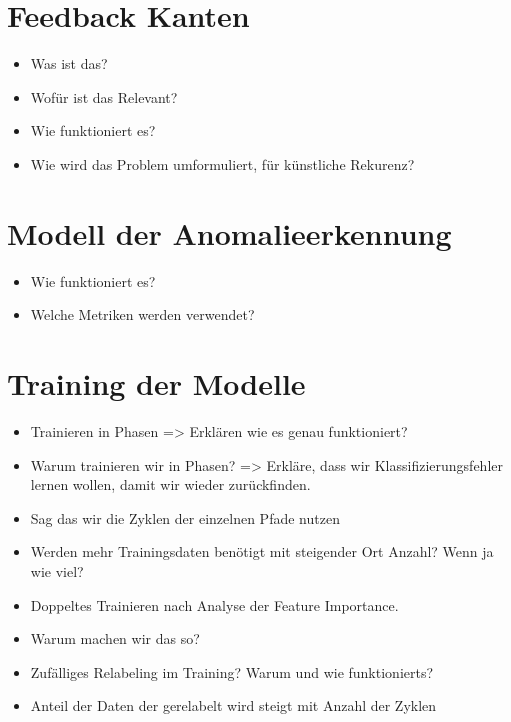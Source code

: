 



\section{Feedback Kanten}
\begin{itemize}
    \item Was ist das?
    \item Wofür ist das Relevant?
    \item Wie funktioniert es?
    \item Wie wird das Problem umformuliert, für künstliche Rekurenz?
\end{itemize}

\section{Modell der Anomalieerkennung}
\begin{itemize}
    \item Wie funktioniert es?
    \item Welche Metriken werden verwendet?
\end{itemize}

\section{Training der Modelle}
\begin{itemize}
    \item Trainieren in Phasen => Erklären wie es genau funktioniert?
    \item Warum trainieren wir in Phasen? => Erkläre, dass wir Klassifizierungsfehler lernen wollen, damit wir wieder zurückfinden.
    \item Sag das wir die Zyklen der einzelnen Pfade nutzen
    \item Werden mehr Trainingsdaten benötigt mit steigender Ort Anzahl? Wenn ja wie viel?
    \item Doppeltes Trainieren nach Analyse der Feature Importance.
    \item Warum machen wir das so?
    \item Zufälliges Relabeling im Training? Warum und wie funktionierts?
    \item Anteil der Daten der gerelabelt wird steigt mit Anzahl der Zyklen
\end{itemize}
